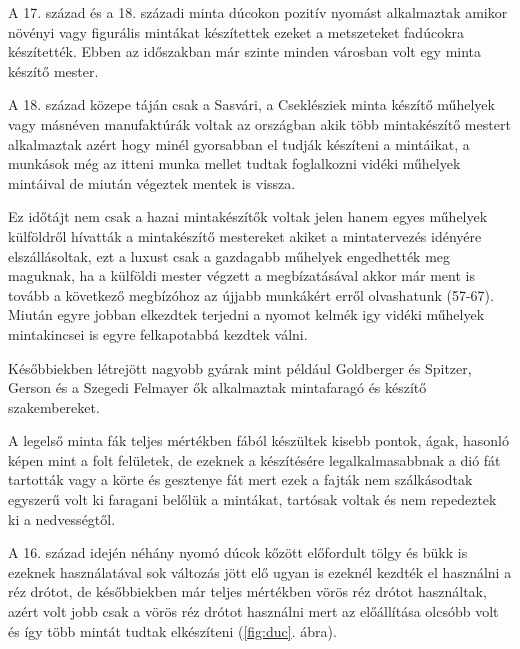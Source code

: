 \documentclass[fontsize=12pt, appendixprefix=true]{scrreprt}
\begin{document}
A 17. század és a 18. századi minta dúcokon pozitív nyomást alkalmaztak amikor növényi vagy figurális mintákat készítettek ezeket a metszeteket fadúcokra készítették. Ebben az időszakban már szinte minden városban volt egy minta készítő mester.

A 18. század közepe táján csak a Sasvári, a Cseklésziek minta készítő műhelyek vagy másnéven manufaktúrák  voltak az országban akik több mintakészítő mestert alkalmaztak azért hogy minél gyorsabban el tudják készíteni a mintáikat, a munkások még az itteni munka mellet tudtak foglalkozni vidéki műhelyek mintáival de miután végeztek mentek is vissza. 

Ez időtájt nem csak a hazai mintakészítők voltak jelen hanem egyes műhelyek külföldről hívatták a mintakészítő mestereket akiket a mintatervezés idényére elszállásoltak, ezt a luxust csak a gazdagabb műhelyek engedhették meg maguknak, ha a külföldi mester végzett a megbízatásával akkor már ment is tovább a következő megbízóhoz az újjabb munkákért erről olvashatunk \cite{domonkos1981magyarorszagi} (57-67).
Miután egyre jobban elkezdtek terjedni a nyomot kelmék igy vidéki műhelyek mintakincsei is egyre felkapotabbá kezdtek válni.

Későbbiekben létrejött nagyobb gyárak mint például Goldberger és Spitzer, Gerson és a Szegedi Felmayer ők alkalmaztak mintafaragó és készítő szakembereket.

A legelső minta fák teljes mértékben fából készültek kisebb pontok, ágak, hasonló képen mint a folt felületek, de ezeknek a készítésére legalkalmasabbnak a dió fát tartották vagy a körte és gesztenye fát mert ezek a fajták nem szálkásodtak egyszerű volt ki faragani belőlük a mintákat, tartósak voltak és nem repedeztek ki a nedvességtől.

A 16. század idején néhány nyomó dúcok kőzött előfordult tölgy és bükk is ezeknek használatával sok változás jött elő ugyan is ezeknél kezdték el használni a réz drótot, de későbbiekben már teljes mértékben vörös réz drótot használtak, azért volt jobb csak a vörös réz drótot használni mert az előállítása olcsóbb volt és így több mintát tudtak elkészíteni (\ref{fig:duc}. ábra).
\end{document}
